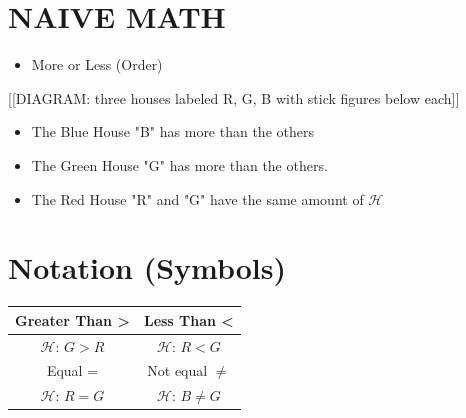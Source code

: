 \documentclass{article}
\begin{document}
\section*{NAIVE MATH}

\begin{itemize}
    \item More or Less (Order)
\end{itemize}

[[DIAGRAM: three houses labeled R, G, B with stick figures below each]]

\begin{itemize}
    \item The Blue House "B" has more than the others
    \item The Green House "G" has more than the others.
    \item The Red House "R" and "G" have the same amount of $\mathcal{H}$
\end{itemize}

\section*{Notation (Symbols)}

\begin{tabular}{|c|c|}
    \hline
    Greater Than > & Less Than < \\
    \hline
    $\mathcal{H}$: $G > R$ & $\mathcal{H}$: $R < G$ \\
    \hline
    Equal = & Not equal $\neq$ \\
    \hline
    $\mathcal{H}$: $R = G$ & $\mathcal{H}$: $B \neq G$ \\
    \hline
\end{tabular}
\end{document}
